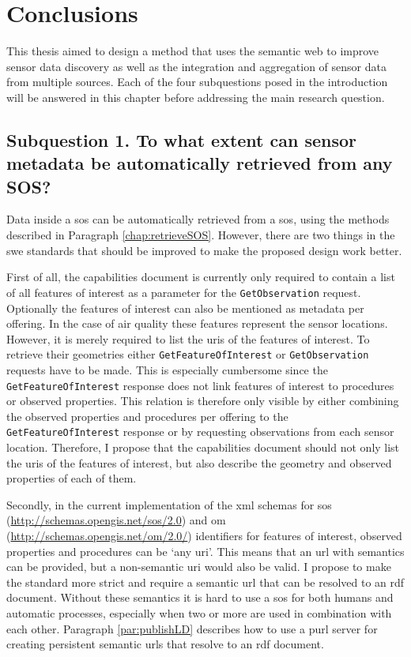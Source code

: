 
\chapter{Conclusions}
\label{chap:conclusion}

This thesis aimed to design a method that uses the semantic web to improve sensor data discovery as well as the integration and aggregation of sensor data from multiple sources. Each of the four subquestions posed in the introduction will be answered in this chapter before addressing the main research question.

\section*{\textbf{Subquestion 1.} To what extent can sensor metadata be automatically retrieved from any SOS?}%

Data inside a \acl{sos} can be automatically retrieved from a \ac{sos}, using the methods described in Paragraph \ref{chap:retrieveSOS}. However, there are two things in the \ac{swe} standards that should be improved to make the proposed design work better. 

First of all, the capabilities document is currently only required to contain a list of all features of interest as a parameter for the \texttt{GetObservation} request. Optionally the features of interest can also be mentioned as metadata per offering. In the case of air quality these features represent the sensor locations. However, it is merely required to list the \acp{uri} of the features of interest. To retrieve their geometries either \texttt{GetFeatureOfInterest} or \texttt{GetObservation} requests have to be made. This is especially cumbersome since the \texttt{GetFeatureOfInterest} response does not link features of interest to procedures or observed properties. This relation is therefore only visible by either combining the observed properties and procedures per offering to the \texttt{GetFeatureOfInterest} response or by requesting observations from each sensor location. Therefore, I propose that the capabilities document should not only list the \acp{uri} of the features of interest, but also describe the geometry and observed properties of each of them. 

Secondly, in the current implementation of the \ac{xml} schemas for \ac{sos} (\url{http://schemas.opengis.net/sos/2.0}) and \ac{om} (\url{http://schemas.opengis.net/om/2.0/}) identifiers for features of interest, observed properties and procedures can be `any \ac{uri}'. This means that an \ac{url} with semantics can be provided, but a non-semantic \ac{uri} would also be valid. I propose to make the standard more strict and require a semantic \ac{url} that can be resolved to an \ac{rdf} document. Without these semantics it is hard to use a \ac{sos} for both humans and automatic processes, especially when two or more are used in combination with each other. Paragraph \ref{par:publishLD} describes how to use a \ac{purl} server for creating persistent semantic \acp{url} that resolve to an \ac{rdf} document. 

